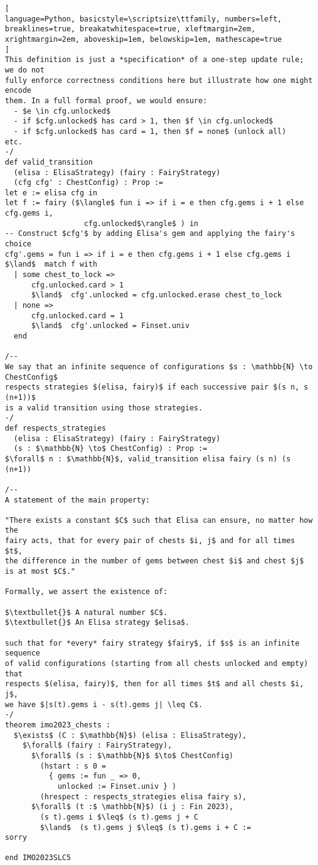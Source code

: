\begin{tcolorbox}
\begin{lstlisting}[
language=Python, basicstyle=\scriptsize\ttfamily, numbers=left, breaklines=true, breakatwhitespace=true, xleftmargin=2em, xrightmargin=2em, aboveskip=1em, belowskip=1em, mathescape=true
]
This definition is just a *specification* of a one-step update rule; we do not
fully enforce correctness conditions here but illustrate how one might encode
them. In a full formal proof, we would ensure:
  - $e \in cfg.unlocked$
  - if $cfg.unlocked$ has card > 1, then $f \in cfg.unlocked$
  - if $cfg.unlocked$ has card = 1, then $f = none$ (unlock all)
etc.
-/
def valid_transition 
  (elisa : ElisaStrategy) (fairy : FairyStrategy)
  (cfg cfg' : ChestConfig) : Prop :=
let e := elisa cfg in
let f := fairy ($\langle$ fun i => if i = e then cfg.gems i + 1 else cfg.gems i,
                  cfg.unlocked$\rangle$ ) in
-- Construct $cfg'$ by adding Elisa's gem and applying the fairy's choice
cfg'.gems = fun i => if i = e then cfg.gems i + 1 else cfg.gems i
$\land$  match f with
  | some chest_to_lock =>
      cfg.unlocked.card > 1
      $\land$  cfg'.unlocked = cfg.unlocked.erase chest_to_lock
  | none =>
      cfg.unlocked.card = 1
      $\land$  cfg'.unlocked = Finset.univ
  end

/--
We say that an infinite sequence of configurations $s : \mathbb{N} \to ChestConfig$
respects strategies $(elisa, fairy)$ if each successive pair $(s n, s (n+1))$
is a valid transition using those strategies.
-/
def respects_strategies 
  (elisa : ElisaStrategy) (fairy : FairyStrategy)
  (s : $\mathbb{N} \to$ ChestConfig) : Prop :=
$\forall$ n : $\mathbb{N}$, valid_transition elisa fairy (s n) (s (n+1))

/--
A statement of the main property:

"There exists a constant $C$ such that Elisa can ensure, no matter how the
fairy acts, that for every pair of chests $i, j$ and for all times $t$,
the difference in the number of gems between chest $i$ and chest $j$
is at most $C$."

Formally, we assert the existence of:

$\textbullet{}$ A natural number $C$.
$\textbullet{}$ An Elisa strategy $elisa$.

such that for *every* fairy strategy $fairy$, if $s$ is an infinite sequence
of valid configurations (starting from all chests unlocked and empty) that
respects $(elisa, fairy)$, then for all times $t$ and all chests $i, j$,
we have $|s(t).gems i - s(t).gems j| \leq C$.
-/
theorem imo2023_chests :
  $\exists$ (C : $\mathbb{N}$) (elisa : ElisaStrategy),
    $\forall$ (fairy : FairyStrategy),
      $\forall$ (s : $\mathbb{N}$ $\to$ ChestConfig)
        (hstart : s 0 = 
          { gems := fun _ => 0,
            unlocked := Finset.univ } )
        (hrespect : respects_strategies elisa fairy s),
      $\forall$ (t :$ \mathbb{N}$) (i j : Fin 2023),
        (s t).gems i $\leq$ (s t).gems j + C
        $\land$  (s t).gems j $\leq$ (s t).gems i + C :=
sorry

end IMO2023SLC5
\end{lstlisting}
\end{tcolorbox}


